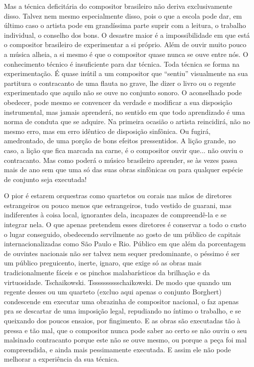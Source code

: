 Mas a técnica deficitária do compositor brasileiro não deriva
exclusivamente disso. Talvez nem mesmo especialmente disso, pois o que a
escola pode dar, em último caso o artista pode em grandíssima parte
suprir com a leitura, o trabalho individual, o conselho dos bons. O
desastre maior é a impossibilidade em que está o compositor brasileiro
de experimentar a si próprio. Além de ouvir muito pouco a música alheia,
a si mesmo é que o compositor quase nunca se ouve entre nós. O
conhecimento técnico é insuficiente para dar técnica. Toda técnica se
forma na experimentação. É quase inútil a um compositor que ``sentiu''
visualmente na sua partitura o contracanto de uma flauta no grave, lhe
dizer o livro ou o regente experimentado que aquilo não se ouve no
conjunto sonoro. O aconselhado pode obedecer, pode mesmo se convencer da
verdade e modificar a sua disposição instrumental, mas jamais aprenderá,
no sentido em que todo aprendizado é uma norma de conduta que se
adquire. Na primeira ocasião o artista reincidirá, não no mesmo erro,
mas em erro idêntico de disposição sinfônica. Ou fugirá, amedrontado, de
uma porção de bons efeitos pressentidos. A lição grande, no caso, a
lição que fica marcada na carne, é o compositor ouvir que... não ouviu o
contracanto. Mas como poderá o músico brasileiro aprender, se às vezes
passa mais de ano sem que uma só das suas obras sinfônicas ou para
qualquer espécie de conjunto seja executada!

O pior é estarem orquestras como quartetos ou corais nas mãos de
diretores estrangeiros ou pouco menos que estrangeiros, tudo vestido de
guarani, mas indiferentes à coisa local, ignorantes dela, incapazes de
compreendê-la e se integrar nela. O que apenas pretendem esses diretores
é conservar a todo o custo o lugar conseguido, obedecendo servilmente ao
gosto de um público de capitais internacionalizadas como São Paulo e
Rio. Público em que além da porcentagem de ouvintes nacionais não ser
talvez nem sequer predominante, o péssimo é ser um público preguicento,
inerte, ignaro, que exige só as obras mais tradicionalmente fáceis e os
pinchos malabarísticos da brilhação e da virtuosidade. Tschaikowski.
Tsssssssssschaikowski. De modo que quando um regente desses ou um
quarteto (excluo aqui apenas o conjunto Borghert) condescende em
executar uma obrazinha de compositor nacional, o faz apenas pra se
descartar de uma imposição legal, repudiando no íntimo o trabalho, e se
queixando dos poucos ensaios, por fingimento. E as obras são executadas
tão à pressa e tão mal, que o compositor nunca pode saber ao certo se
não ouviu o seu malsinado contracanto porque este não se ouve mesmo, ou
porque a peça foi mal compreendida, e ainda mais pessimamente executada.
E assim ele não pode melhorar a experiência da sua técnica.

